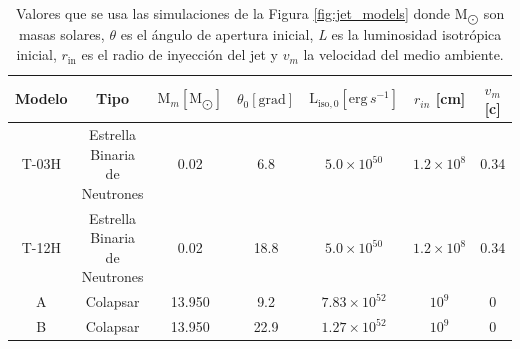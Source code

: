 \documentclass[12pt,a4paper]{book}
\begin{document}
\begin{table}
  \begin{center}
    \begin{tabular}{ c c c c c c c} 
      \hline
      Modelo & Tipo                          & $\text{M}_{m} [\text{M}_{\bigodot}]$  & $\theta_0 [\text{grad}]$ & $\text{L}_{\text{iso},0}  [\text{erg}\,s^{-1}]$ & $r_{in} $ [cm]             & $v_m$ [c]               \\
      \hline
      T-03H  & Estrella Binaria de Neutrones & 0.02                                  &    6.8                   &               $5.0   \times 10^{50}$            &     $1.2 \times 10^8$      &   0.34  \\ 
      T-12H  & Estrella Binaria de Neutrones & 0.02                                  &    18.8                  &               $5.0   \times 10^{50}$            &     $1.2 \times 10^8$      &   0.34  \\ 
      A      & Colapsar                      & 13.950                                &    9.2                   &               $7.83  \times 10^{52}$            &     $10^9$                 &       0                 \\ 
      B      & Colapsar                      & 13.950                                &    22.9                  &               $1.27  \times 10^{52}$            &     $10^9$                 &       0                 \\ 
    \end{tabular}
  \caption{Valores que se usa las simulaciones de la Figura \ref{fig:jet_models} donde $\text{M}_{\bigodot}$ son masas solares, $\theta$ es el ángulo de apertura inicial, \emph{L} es la luminosidad isotrópica inicial,
  $r_{\text{in}}$ es el radio de inyección del jet y $v_m$ la velocidad del medio ambiente.} \label{table:jet_models}
  \end{center}
\end{table}

\end{document}
